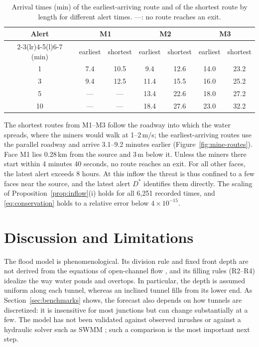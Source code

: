 \documentclass[11pt,a4paper]{article}
\theoremstyle{plain}
\theoremstyle{definition}
\theoremstyle{remark}
\begin{document}
\begin{table}[htbp]
  \centering\small
  \begin{tabular}{@{}c cc cc cc@{}}
    \toprule
    Alert & \multicolumn{2}{c}{M1} & \multicolumn{2}{c}{M2} & \multicolumn{2}{c}{M3} \\
    \cmidrule(lr){2-3}\cmidrule(lr){4-5}\cmidrule(l){6-7}
    (min) & earliest & shortest & earliest & shortest & earliest & shortest \\
    \midrule
    1  & 7.4 & 10.5 & 9.4  & 12.6 & 14.0 & 23.2 \\
    3  & 9.4 & 12.5 & 11.4 & 15.5 & 16.0 & 25.2 \\
    5  & --- & ---  & 13.4 & 22.6 & 18.0 & 27.2 \\
    10 & --- & ---  & 18.4 & 27.6 & 23.0 & 32.2 \\
    \bottomrule
  \end{tabular}
  \caption{Arrival times (min) of the earliest-arriving route and of the shortest route by length for different alert times. ---: no route reaches an exit.}
  \label{tab:mine-alert}
\end{table}


The shortest routes from M1--M3 follow the roadway into which the water spreads, where the miners would walk at 1--2\,m/s; the earliest-arriving routes use the parallel roadway and arrive 3.1--9.2 minutes earlier (Figure~\ref{fig:mine-routes}). Face M1 lies 0.28\,km from the source and 3\,m below it. Unless the miners there start within 4 minutes 40 seconds, no route reaches an exit. For all other faces, the latest alert exceeds 8 hours. At this inflow the threat is thus confined to a few faces near the source, and the latest alert $D^*$ identifies them directly. The scaling of Proposition~\ref{prop:inflow}(i) holds for all 6{,}251 recorded times, and \eqref{eq:conservation} holds to a relative error below $4\times10^{-15}$.

\section{Discussion and Limitations}\label{sec:discussion}

The flood model is phenomenological. Its division rule and fixed front depth are not derived from the equations of open-channel flow \cite{chow}, and its filling rules (R2--R4) idealize the way water ponds and overtops. In particular, the depth is assumed uniform along each tunnel, whereas an inclined tunnel fills from its lower end. As Section~\ref{sec:benchmarks} shows, the forecast also depends on how tunnels are discretized: it is insensitive for most junctions but can change substantially at a few. The model has not been validated against observed inrushes or against a hydraulic solver such as SWMM \cite{swmm}; such a comparison is the most important next step.
\end{document}
